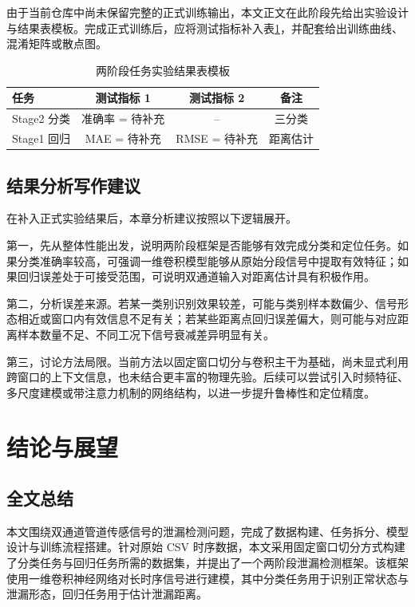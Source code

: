 由于当前仓库中尚未保留完整的正式训练输出，本文正文在此阶段先给出实验设计与结果表模板。完成正式训练后，应将测试指标补入表\ref{tab:main_results}，并配套给出训练曲线、混淆矩阵或散点图。

\begin{table}[!htbp]
  \centering
  \caption{两阶段任务实验结果表模板}
  \label{tab:main_results}
  \vspace{0.5em}
  \begin{tabular}{lccc}
    \toprule
    任务 & 测试指标 1 & 测试指标 2 & 备注 \\
    \midrule
    Stage2 分类 & 准确率 = 待补充 & -- & 三分类 \\
    Stage1 回归 & MAE = 待补充 & RMSE = 待补充 & 距离估计 \\
    \bottomrule
  \end{tabular}
\end{table}

\section{结果分析写作建议}

在补入正式实验结果后，本章分析建议按照以下逻辑展开。

第一，先从整体性能出发，说明两阶段框架是否能够有效完成分类和定位任务。如果分类准确率较高，可强调一维卷积模型能够从原始分段信号中提取有效特征；如果回归误差处于可接受范围，可说明双通道输入对距离估计具有积极作用。

第二，分析误差来源。若某一类别识别效果较差，可能与类别样本数偏少、信号形态相近或窗口内有效信息不足有关；若某些距离点回归误差偏大，则可能与对应距离样本数量不足、不同工况下信号衰减差异明显有关。

第三，讨论方法局限。当前方法以固定窗口切分与卷积主干为基础，尚未显式利用跨窗口的上下文信息，也未结合更丰富的物理先验。后续可以尝试引入时频特征、多尺度建模或带注意力机制的网络结构，以进一步提升鲁棒性和定位精度。

\chapter{结论与展望}

\section{全文总结}

本文围绕双通道管道传感信号的泄漏检测问题，完成了数据构建、任务拆分、模型设计与训练流程搭建。针对原始 CSV 时序数据，本文采用固定窗口切分方式构建了分类任务与回归任务所需的数据集，并提出了一个两阶段泄漏检测框架。该框架使用一维卷积神经网络对长时序信号进行建模，其中分类任务用于识别正常状态与泄漏形态，回归任务用于估计泄漏距离。

